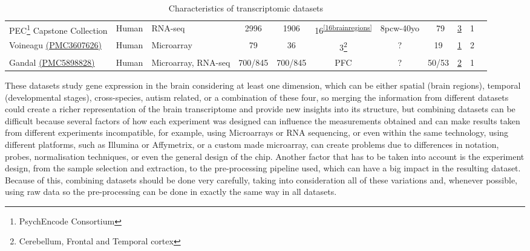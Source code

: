 \begin{sidewaystable}
\begin{center}
\begin{tabularx}{\linewidth}{ X l l c c c c c c c c }
PEC\footnote{PsychEncode Consortium} Capstone Collection & Human & RNA-seq & 2996 & 1906 & 16\textsuperscript{\ref{16brainregions}} & 8pcw-40yo & ~79 & \href{https://www.synapse.org/\#!Synapse:syn12080241}{3} & 1 \\

Voineagu \href{https://www.ncbi.nlm.nih.gov/pmc/articles/PMC3607626}{(PMC3607626)} & Human & Microarray & 79 & 36 & 3\footnote{Cerebellum, Frontal and Temporal cortex} & ? & 19 & \href{https://www.ncbi.nlm.nih.gov/geo/query/acc.cgi?acc=GSE28521}{1} & 2\\

Gandal \href{https://www.ncbi.nlm.nih.gov/pmc/articles/PMC5898828}{(PMC5898828)} & Human & Microarray, RNA-seq & 700/845 & 700/845 & PFC & ? & 50/53 & \href{https://github.com/mgandal/Shared-molecular-neuropathology-across-major-psychiatric-disorders-parallels-polygenic-overlap}{2} & 1 \\

\end{tabularx}
\caption{Characteristics of transcriptomic datasets}
\label{table:transcriptomeDatasets}
\end{center}
\end{sidewaystable}
\restoregeometry

These datasets study gene expression in the brain considering at least one dimension, which can be either spatial (brain regions), temporal (developmental stages), cross-species, autism related, or a combination of these four, so merging the information from different datasets could create a richer representation of the brain transcriptome and provide new insights into its structure, but combining datasets can be difficult because several factors of how each experiment was designed can influence the measurements obtained and can make results taken from different experiments incompatible, for example, using Microarrays or RNA sequencing, or even within the same technology, using different platforms, such as Illumina or Affymetrix, or a custom made microarray, can create problems due to differences in notation, probes, normalisation techniques, or even the general design of the chip. Another factor that has to be taken into account is the experiment design, from the sample selection and extraction, to the pre-processing pipeline used, which can have a big impact in the resulting dataset. Because of this, combining datasets should be done very carefully, taking into consideration all of these variations and, whenever possible, using raw data so the pre-processing can be done in exactly the same way in all datasets.

